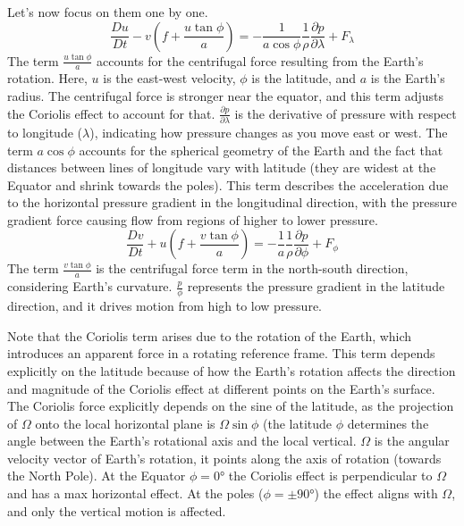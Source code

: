 Let's now focus on them one by one.
\begin{equation}
    \frac{Du}{Dt}-v\left(f+\frac{u\tan\phi}{a}\right)=-\frac{1}{a\cos\phi}\frac{1}{\rho}\frac{\partial p}{\partial\lambda}+F_{\lambda}
\end{equation}
The term $\frac{u\tan\phi}{a}$ accounts for the centrifugal force resulting from the Earth's rotation. Here, $u$ is the east-west velocity, $\phi$ is the latitude, and $a$ is the Earth's radius. The centrifugal force is stronger near the equator, and this term adjusts the Coriolis effect to account for that.
$\frac{\partial p}{\partial\lambda}$ is the derivative of pressure with respect to longitude ($\lambda$), indicating how pressure changes as you move east or west. The term $a\cos\phi$ accounts for the spherical geometry of the Earth and the fact that distances between lines of longitude vary with latitude (they are widest at the Equator and shrink towards the poles). This term describes the acceleration due to the horizontal pressure gradient in the longitudinal direction, with the pressure gradient force causing flow from regions of higher to lower pressure.
\begin{equation}
    \frac{Dv}{Dt}+u\left(f+\frac{v\tan\phi}{a}\right)=-\frac{1}{a}\frac{1}{\rho}\frac{\partial p}{\partial\phi}+F_{\phi}
\end{equation}
The term $\frac{v\tan\phi}{a}$ is the centrifugal force term in the north-south direction, considering Earth's curvature. $\frac{p}{\phi}$ represents the pressure gradient in the latitude direction, and it drives motion from high to low pressure.


Note that the Coriolis term arises due to the rotation of the Earth, which introduces an apparent force in a rotating reference frame. This term depends explicitly on the latitude because of how the Earth's rotation affects the direction and magnitude of the Coriolis effect at different points on the Earth's surface. The Coriolis force explicitly depends on the sine of the latitude, as the projection of $\Omega$ onto the local horizontal plane is $\Omega\sin\phi$ (the latitude $\phi$ determines the angle between the Earth's rotational axis and the local vertical. $\Omega$ is the angular velocity vector of Earth's rotation, it points along the axis of rotation (towards the North Pole). At the Equator $\phi=0°$ the Coriolis effect is perpendicular to $\Omega$ and has a max horizontal effect. At the poles ($\phi=\pm 90°$) the effect aligns with $\Omega$, and only the vertical motion is affected.

